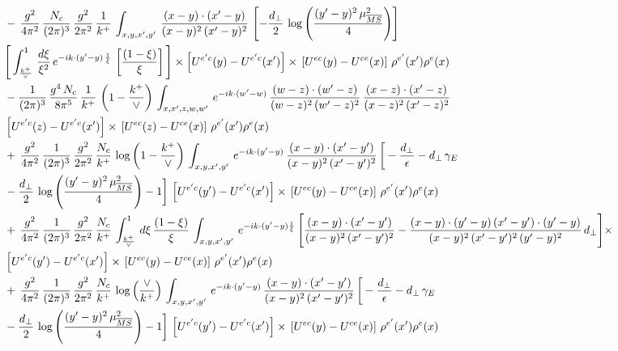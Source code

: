 \begin{align}
&   -\,\frac{g^{2}}{4\pi^{2}}\, \frac{N_{c}}{(2\pi)^{3}}\,\frac{g^{2}}{2\pi^{2}}\, \frac{1}{k^{+}}\,\int_{x,y,x',y'}\,\frac{(x-y)\cdot (x'-y)}{(x-y)^{2}\,(x'-y)^{2}}\,\left[-\frac{d_{\perp}}{2}\,\log{\left(\frac{(y'-y)^{2}\,\mu^{2}_{\overline{MS}}}{4}\right)}\right]\,\notag \\ &  \Bigg[\int_{\frac{k^{+}}{\vee}}^{1}\,\frac{d\xi}{\xi^{2}}\,e^{-ik\cdot (y'-y)\,\frac{1}{\xi}}\,\left[\frac{(1-\xi)}{\xi}\right]\Bigg]\times \left[U^{e'c}(y) - U^{e'c}(x')\right] \times\, \left[U^{ec}(y) - U^{ce}(x)\right]\, \rho^{e'}(x') \rho^{e}(x) \notag \\
&   -\frac{1}{(2\pi)^{3}}\,\frac{g^{4}\,N_{c}}{8\pi^{5}}\,\frac{1}{k^{+}}\,\left(1-\frac{k^{+}}{\vee}\right)\,\int_{x,x',z,w,w'}\,e^{-ik\cdot (w'-w)}\,\frac{(w-z)\cdot(w'-z)}{(w-z)^{2}\,(w'-z)^{2}}\,\frac{(x-z)\cdot(x'-z)}{(x-z)^{2}\,(x'-z)^{2}}\notag \\
& \left[U^{e'c}(z) - U^{e'c}(x')\right] \times\, \left[U^{ec}(z) - U^{ce}(x)\right]\, \rho^{e'}(x') \rho^{e}(x) \notag \\
&  +\, \frac{g^{2}}{4\pi^{2}}\, \frac{1}{(2\pi)^{3}}\,\frac{g^{2}}{2\pi^{2}}\, \frac{N_{c}}{k^{+}}\,\log{\left(1-\frac{k^{+}}{\vee}\right)}\,\int_{x,y,x',y'}\,e^{-ik\cdot (y'-y)}\,\frac{(x-y)\cdot (x'-y')}{(x-y)^{2}\,(x'-y')^{2}}\,\bigg[-\frac{d_{\perp}}{\epsilon}-d_{\perp}\,\gamma_{E}\notag \\ & -\frac{d_{\perp}}{2}\,\log{\left(\frac{(y'-y)^{2}\,\mu^{2}_{\overline{MS}}}{4}\right)}-1\bigg]\,\left[U^{e'c}(y') - U^{e'c}(x')\right] \times\, \left[U^{ec}(y) - U^{ce}(x)\right]\, \rho^{e'}(x') \rho^{e}(x) \notag \\
& +\,\frac{g^{2}}{4\pi^{2}}\, \frac{1}{(2\pi)^{3}}\,\frac{g^{2}}{2\pi^{2}}\, \frac{N_{c}}{k^{+}}\,\int_{\frac{k^{+}}{\vee}}^{1}\,d\xi\, \frac{(1-\xi)}{\xi}\, \int_{x,y,x',y'}\,e^{-ik\cdot (y'-y)\frac{1}{\xi}}\,\Bigg[\frac{(x-y)\cdot (x'-y')}{(x-y)^{2}\, (x'-y')^{2}} -\frac{(x-y)\cdot (y'-y)\, (x'-y')\cdot (y'-y)}{(x-y)^{2}\,(x'-y')^{2}\,(y'-y)^{2}}\,d_{\perp}\Bigg]\times\notag \\ &  \left[U^{e'c}(y') - U^{e'c}(x')\right] \times\, \left[U^{ec}(y) - U^{ce}(x)\right]\, \rho^{e'}(x') \rho^{e}(x) \notag \\ & +\, \frac{g^{2}}{4\pi^{2}}\, \frac{1}{(2\pi)^{3}}\,\frac{g^{2}}{2\pi^{2}}\, \frac{N_{c}}{k^{+}}\,\log{\left(\frac{\vee}{k^{+}}\right)}\,\int_{x,y,x',y'}\,e^{-ik\cdot (y'-y)}\,\frac{(x-y)\cdot (x'-y')}{(x-y)^{2}\,(x'-y')^{2}}\,\bigg[-\frac{d_{\perp}}{\epsilon}-d_{\perp}\,\gamma_{E}\notag \\ & -\frac{d_{\perp}}{2}\,\log{\left(\frac{(y'-y)^{2}\,\mu^{2}_{\overline{MS}}}{4}\right)}-1\bigg]\,\left[U^{e'c}(y') - U^{e'c}(x')\right] \times\, \left[U^{ec}(y) - U^{ce}(x)\right]\, \rho^{e'}(x') \rho^{e}(x) \notag \\

\end{align}
